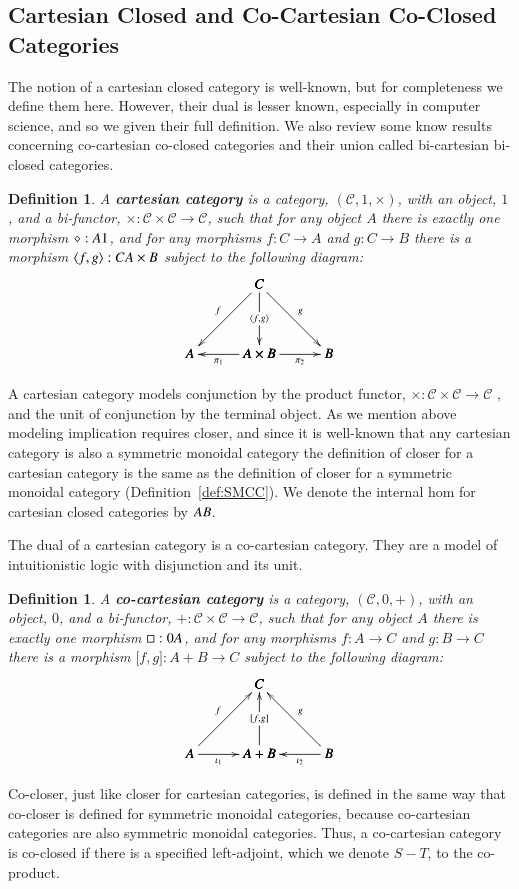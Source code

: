 \documentclass{lmcs}
\newtheorem{definition}[theorem]{Definition}
\let\mto\to
\let\to\relax
\newcommand{\to}{\rightarrow}
\newcommand{\cat}[1]{\mathcal{#1}}
\begin{document}
\subsection{Cartesian Closed and Co-Cartesian Co-Closed Categories}
\label{subsec:cartesian_closed_and_co-cartesian_co-closed_categories}
The notion of a cartesian closed category is well-known, but for
completeness we define them here.  However, their dual is lesser
known, especially in computer science, and so we given their full
definition.  We also review some know results concerning co-cartesian
co-closed categories and their union called bi-cartesian bi-closed
categories.
\begin{definition}
  \label{def:CC}
  A \textbf{cartesian category} is a category, $(\cat{C}, 1, \times)$,
  with an object, $1$, and a bi-functor, $\times : \cat{C} \times
  \cat{C} \mto \cat{C}$, such that for any object $A$ there is exactly
  one morphism $\diamond : A \to 1$, and for any morphisms $f : C \mto
  A$ and $g : C \mto B$ there is a morphism $\langle f , g \rangle : C
  \to A \times B$ subject to the following diagram:
  \[
  \bfig
  \Atrianglepair/->`->`->`<-`->/[C`A`A\times B`B;
    f`
    \langle f , g \rangle`
    g`
    \pi_1`
    \pi_2]
  \efig
  \]
\end{definition}
A cartesian category models conjunction by the product functor,
$\times : \cat{C} \times \cat{C} \mto \cat{C}$ , and the unit of
conjunction by the terminal object.  As we mention above modeling
implication requires closer, and since it is well-known that any
cartesian category is also a symmetric monoidal category the
definition of closer for a cartesian category is the same as the
definition of closer for a symmetric monoidal category
(Definition~\ref{def:SMCC}).  We denote the internal hom for cartesian
closed categories by $A \to B$.

The dual of a cartesian category is a co-cartesian category.  They are
a model of intuitionistic logic with disjunction and its unit.
\begin{definition}
  \label{def:CC}
  A \textbf{co-cartesian category} is a category, $(\cat{C}, 0, +)$,
  with an object, $0$, and a bi-functor,
  $+ : \cat{C} \times \cat{C} \mto \cat{C}$, such that for any object $A$ there is exactly
  one morphism $\Box : 0 \to A$, and for any morphisms $f : A \mto C$ and $g : B \mto C$
  there is a morphism $\lbrack f , g \rbrack : A + B \mto C$
  subject to the following diagram:
  \[
  \bfig
  \Atrianglepair/<-`<-`<-`->`<-/[C`A`A+B`B;
    f`
    \lbrack f, g \rbrack`
    g`
    \iota_1`
    \iota_2]
  \efig
  \]  
\end{definition}
Co-closer, just like closer for cartesian categories, is defined in
the same way that co-closer is defined for symmetric monoidal
categories, because co-cartesian categories are also symmetric
monoidal categories.  Thus, a co-cartesian category is co-closed if
there is a specified left-adjoint, which we denote $S - T$, to the
co-product.
\end{document}

